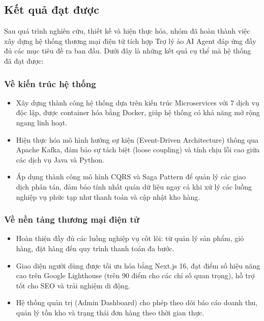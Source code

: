 \subsection{Kết quả đạt được}

Sau quá trình nghiên cứu, thiết kế và hiện thực hóa, nhóm đã hoàn thành việc xây dựng hệ thống thương mại điện tử tích hợp Trợ lý ảo AI Agent đáp ứng đầy đủ các mục tiêu đề ra ban đầu. Dưới đây là những kết quả cụ thể mà hệ thống đã đạt được:

\subsubsection{Về kiến trúc hệ thống}
\begin{itemize}
    \item Xây dựng thành công hệ thống dựa trên kiến trúc Microservices với 7 dịch vụ độc lập, được container hóa bằng Docker, giúp hệ thống có khả năng mở rộng ngang linh hoạt.
    \item Hiện thực hóa mô hình hướng sự kiện (Event-Driven Architecture) thông qua Apache Kafka, đảm bảo sự tách biệt (loose coupling) và tính chịu lỗi cao giữa các dịch vụ Java và Python.
    \item Áp dụng thành công mô hình CQRS và Saga Pattern để quản lý các giao dịch phân tán, đảm bảo tính nhất quán dữ liệu ngay cả khi xử lý các luồng nghiệp vụ phức tạp như thanh toán và cập nhật kho hàng.
\end{itemize}

\subsubsection{Về nền tảng thương mại điện tử}
\begin{itemize}
    \item Hoàn thiện đầy đủ các luồng nghiệp vụ cốt lõi: từ quản lý sản phẩm, giỏ hàng, đặt hàng đến quy trình thanh toán đa bước.
    \item Giao diện người dùng được tối ưu hóa bằng Next.js 16, đạt điểm số hiệu năng cao trên Google Lighthouse (trên 90 điểm cho các chỉ số quan trọng), hỗ trợ tốt cho SEO và trải nghiệm di động.
    \item Hệ thống quản trị (Admin Dashboard) cho phép theo dõi báo cáo doanh thu, quản lý tồn kho và trạng thái đơn hàng theo thời gian thực.
\end{itemize}

